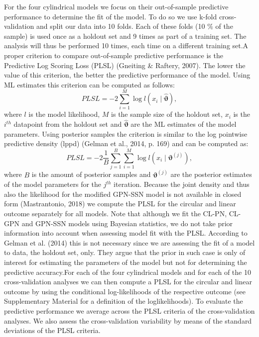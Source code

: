 \documentclass[man]{apa6}
\theoremstyle{definition}
\theoremstyle{definition}
\theoremstyle{definition}
\theoremstyle{remark}
\begin{document}
For the four cylindrical models we focus on their out-of-sample
predictive performance to determine the fit of the model. To do so we
use k-fold cross-validation and split our data into 10 folds. Each of
these folds (10 \(\%\) of the sample) is used once as a holdout set and
9 times as part of a training set. The analysis will thus be performed
10 times, each time on a different training set.\newline \indent A
proper criterion to compare out-of-sample predictive performance is the
Predictive Log Scoring Loss (PLSL) (Gneiting \& Raftery, 2007). The
lower the value of this criterion, the better the predictive performance
of the model. Using ML estimates this criterion can be computed as
follows: \begin{equation}\label{PLSLML}
PLSL = -2 \sum_{i = 1}^{M}\log l(x_i \mid \hat{\boldsymbol{\vartheta}}),\nonumber
\end{equation} \noindent where \(l\) is the model likelihood, \(M\) is
the sample size of the holdout set, \(x_i\) is the \(i^{th}\) datapoint
from the holdout set and \(\hat{\boldsymbol{\vartheta}}\) are the ML
estimates of the model parameters. Using posterior samples the criterion
is similar to the log pointwise predictive density (lppd) (Gelman et
al., 2014, p. 169) and can be computed as:
\begin{equation}\label{PLSLBayes}
PLSL = -2 \frac{1}{B} \sum_{j = 1}^{B}\sum_{i = 1}^{M} \log l(x_i \mid \boldsymbol{\vartheta}^{(j)}),\nonumber
\end{equation} \noindent where \(B\) is the amount of posterior samples
and \(\boldsymbol{\vartheta}^{(j)}\) are the posterior estimates of the
model parameters for the \(j^{th}\) iteration. Because the joint density
and thus also the likelihood for the modified GPN-SSN model is not
available in closed form (Mastrantonio, 2018) we compute the PLSL for
the circular and linear outcome separately for all models. Note that
although we fit the CL-PN, CL-GPN and GPN-SSN models using Bayesian
statistics, we do not take prior information into account when assessing
model fit with the PLSL. According to Gelman et al. (2014) this is not
necessary since we are assessing the fit of a model to data, the holdout
set, only. They argue that the prior in such case is only of interest
for estimating the parameters of the model but not for determining the
predictive accuracy.\newline \indent For each of the four cylindrical
models and for each of the 10 cross-validation analyses we can then
compute a PLSL for the circular and linear outcome by using the
conditional log-likelihoods of the respective outcome (see Supplementary
Material for a definition of the loglikelihoods). To evaluate the
predictive performance we average across the PLSL criteria of the
cross-validation analyses. We also assess the cross-validation
variability by means of the standard deviations of the PLSL criteria.
\end{document}
